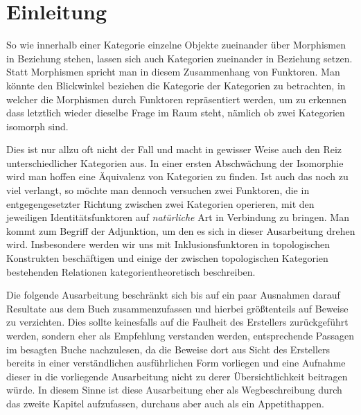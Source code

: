 \section*{Einleitung}

So wie innerhalb einer Kategorie einzelne Objekte zueinander über Morphismen in Beziehung stehen, lassen sich auch Kategorien zueinander in Beziehung setzen. Statt Morphismen spricht man in diesem Zusammenhang von Funktoren. Man könnte den Blickwinkel beziehen die Kategorie der Kategorien zu betrachten, in welcher die Morphismen durch Funktoren repräsentiert werden, um zu erkennen dass letztlich wieder dieselbe Frage im Raum steht, nämlich ob zwei Kategorien isomorph sind.

Dies ist nur allzu oft nicht der Fall und macht in gewisser Weise auch den Reiz unterschiedlicher Kategorien aus. In einer ersten Abschwächung der Isomorphie wird man hoffen eine Äquivalenz von Kategorien zu finden. Ist auch das noch zu viel verlangt, so möchte man dennoch versuchen zwei Funktoren, die in entgegengesetzter Richtung zwischen zwei Kategorien operieren, mit den jeweiligen Identitätsfunktoren auf \emph{natürliche} Art in Verbindung zu bringen. Man kommt zum Begriff der Adjunktion, um den es sich in dieser Ausarbeitung drehen wird. Insbesondere werden wir uns mit Inklusionsfunktoren in topologischen Konstrukten beschäftigen und einige der zwischen topologischen Kategorien bestehenden Relationen kategorientheoretisch beschreiben.

Die folgende Ausarbeitung beschränkt sich bis auf ein paar Ausnahmen darauf Resultate aus dem Buch \cite{preuss} zusammenzufassen und hierbei größtenteils auf Beweise zu verzichten. 
Dies sollte keinesfalls auf die Faulheit des Erstellers zurückgeführt werden, sondern eher als Empfehlung verstanden werden, entsprechende Passagen im besagten Buche nachzulesen, da die Beweise dort aus Sicht des Erstellers bereits in einer verständlichen ausführlichen Form vorliegen und eine Aufnahme dieser in die vorliegende Ausarbeitung nicht zu derer Übersichtlichkeit beitragen würde.
In diesem Sinne ist diese Ausarbeitung eher als Wegbeschreibung durch das zweite Kapitel aufzufassen, durchaus aber auch als ein Appetithappen.
